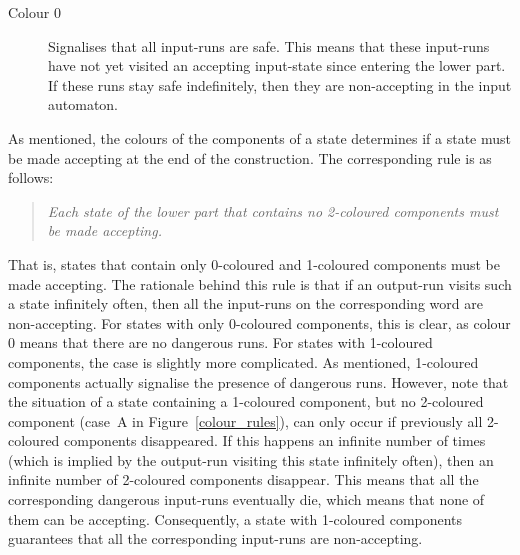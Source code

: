 {\begin{description}


\item[Colour 0]
Signalises that all input-runs are safe. This means that these input-runs have not yet visited an accepting input-state since entering the lower part. If these runs stay safe indefinitely, then they are non-accepting in the input automaton. 
\end{description}}

As mentioned, the colours of the components of a state determines if a state must be made accepting at the end of the construction. The corresponding rule is as follows:

\begin{quote}
\centering
\textit{Each state of the lower part that contains no 2-coloured components must be made accepting.}
\end{quote}

That is, states that contain only 0-coloured and 1-coloured components must be made accepting. The rationale behind this rule is that if an output-run visits such a state infinitely often, then all the input-runs on the corresponding word are non-accepting. For states with only 0-coloured components, this is clear, as colour 0 means that there are no dangerous runs. For states with 1-coloured components, the case is slightly more complicated. As mentioned, 1-coloured components actually signalise the presence of dangerous runs. However, note that the situation of a state containing a 1-coloured component, but no 2-coloured component (case~A in Figure~\ref{colour_rules}), can only occur if previously all 2-coloured components disappeared. If this happens an infinite number of times (which is implied by the output-run visiting this state infinitely often), then an infinite number of 2-coloured components disappear. This means that all the corresponding dangerous input-runs eventually die, which means that none of them can be accepting. Consequently, a state with 1-coloured components guarantees that all the corresponding input-runs are non-accepting.

